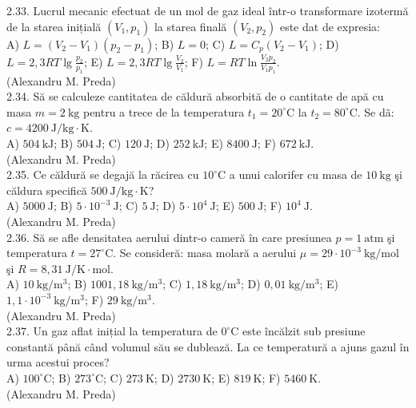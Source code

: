 2.33. Lucrul mecanic efectuat de un mol de gaz ideal într-o transformare izotermă de la starea inițială $\left(V_{1}, p_{1}\right)$ la starea finală $\left(V_{2}, p_{2}\right)$ este dat de expresia:\\ A) $L=\left(V_{2}-V_{1}\right)\left(p_{2}-p_{1}\right)$; B) $L=0$; C) $L=C_{p}\left(V_{2}-V_{1}\right)$; D) $L=2,3 R T \lg \frac{p_{2}}{p_{1}}$; E) $L=2,3 R T \lg \frac{V_{2}}{V_{1}}$; F) $L=R T \ln \frac{V_{2} p_{2}}{V_{1} p_{1}}$.\\ (Alexandru M. Preda)\\

2.34. Să se calculeze cantitatea de căldură absorbită de o cantitate de apă cu masa $m=2 \mathrm{~kg}$ pentru a trece de la temperatura $t_{1}=20^{\circ} \mathrm{C}$ la $t_{2}=80^{\circ} \mathrm{C}$. Se dã: $c=4200 \mathrm{~J} / \mathrm{kg} \cdot \mathrm{K}$.\\ A) $504 \mathrm{~kJ}$; B) $504 \mathrm{~J}$; C) $120 \mathrm{~J}$; D) $252 \mathrm{~kJ}$; E) $8400 \mathrm{~J}$; F) $672 \mathrm{~kJ}$.\\ (Alexandru M. Preda)\\

2.35. Ce căldură se degajă la răcirea cu $10^{\circ} \mathrm{C}$ a unui calorifer cu masa de $10 \mathrm{~kg}$ şi căldura specifică $500 \mathrm{~J} / \mathrm{kg} \cdot \mathrm{K}$?\\ A) $5000 \mathrm{~J}$; B) $5 \cdot 10^{-3} \mathrm{~J}$; C) $5 \mathrm{~J}$; D) $5 \cdot 10^{4} \mathrm{~J}$; E) $500 \mathrm{~J}$; F) $10^{4} \mathrm{~J}$.\\ (Alexandru M. Preda)\\

2.36. Să se afle densitatea aerului dintr-o cameră în care presiunea $p=1 \mathrm{~atm}$ şi temperatura $t=27^{\circ} \mathrm{C}$. Se consideră: masa molară a aerului $\mu=29 \cdot 10^{-3} \mathrm{~kg} / \mathrm{mol}$ şi $R=8,31 \mathrm{~J} / \mathrm{K} \cdot \mathrm{mol}$.\\ A) $10 \mathrm{~kg} / \mathrm{m}^{3}$; B) $1001,18 \mathrm{~kg} / \mathrm{m}^{3}$; C) $1,18 \mathrm{~kg} / \mathrm{m}^{3}$; D) $0,01 \mathrm{~kg} / \mathrm{m}^{3}$; E) $1,1 \cdot 10^{-3} \mathrm{~kg} / \mathrm{m}^{3}$; F) $29 \mathrm{~kg} / \mathrm{m}^{3}$.\\ (Alexandru M. Preda)\\

2.37. Un gaz aflat inițial la temperatura de $0^{\circ} \mathrm{C}$ este încălzit sub presiune constantă până când volumul său se dublează. La ce temperatură a ajuns gazul în urma acestui proces?\\ A) $100^{\circ} \mathrm{C}$; B) $273^{\circ} \mathrm{C}$; C) $273 \mathrm{~K}$; D) $2730 \mathrm{~K}$; E) $819 \mathrm{~K}$; F) $5460 \mathrm{~K}$.\\ (Alexandru M. Preda)\\

